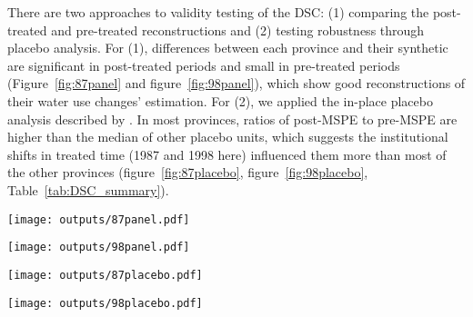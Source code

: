 \documentclass[default, sn-standardnature]{sn-jnl}
\begin{document}
There are two approaches to validity testing of the DSC: (1) comparing the post-treated and pre-treated reconstructions and (2) testing robustness through placebo analysis.
For (1), differences between each province and their synthetic are significant in post-treated periods and small in pre-treated periods (Figure~\ref{fig:87panel} and figure~\ref{fig:98panel}), which show good reconstructions of their water use changes' estimation.
For (2), we applied the in-place placebo analysis described by \cite{abadie2010}. In most provinces, ratios of post-MSPE to pre-MSPE are higher than the median of other placebo units, which suggests the institutional shifts in treated time (1987 and 1998 here) influenced them more than most of the other provinces (figure~\ref{fig:87placebo}, figure~\ref{fig:98placebo}, Table~\ref{tab:DSC_summary}).

\begin{figure*}
    \texttt{[image: outputs/87panel.pdf]}
    \centering
    \caption{Comparations between YRB' provinces and their synthetic controls around the 87-WAS.}
    \label{fig:87panel}
\end{figure*}

\begin{figure*}
    \texttt{[image: outputs/98panel.pdf]}
    \centering
    \caption{Comparations between YRB' provinces and their synthetic controls around the 98-UBR.}
    \label{fig:98panel}
\end{figure*}


\begin{figure*}
    \texttt{[image: outputs/87placebo.pdf]}
    \centering
    \caption{Gaps in change in water use between provinces outside the YRB and their synthetic control, around the 87-WAS, excluding the provinces with high pre-treatment RMSPE (more than $3$ times of treated units' RMSPE).}
    \label{fig:87placebo}
\end{figure*}

\begin{figure*}
    \texttt{[image: outputs/98placebo.pdf]}
    \centering
    \caption{Gaps in change in water use between provinces outside the YRB and their synthetic control, around the 98-UBR, excluding the provinces with high pre-treatment RMSPE (more than $3$ times of treated units' RMSPE)}
    \label{fig:98placebo}
\end{figure*}
\end{document}

